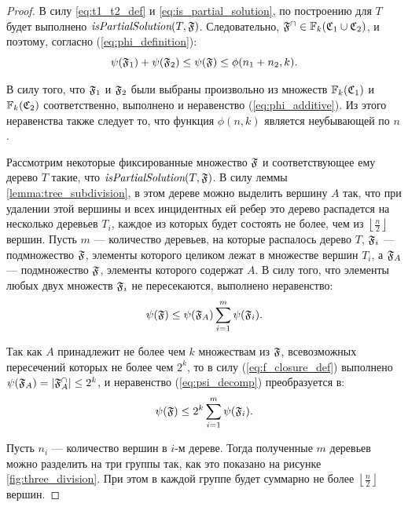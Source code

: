 \begin{proof}
В силу \ref{eq:t1_t2_def} и \ref{eq:is_partial_solution}, по построению для $T$ будет выполнено $\textit{isPartialSolution}(T, \mathfrak{F})$. Следовательно, $\mathfrak{F}^{\cap} \in \mathbb{F}_k(\mathfrak{C}_1 \cup \mathfrak{C}_2)$, и поэтому, согласно (\ref{eq:phi_definition}):
\begin{equation}
\psi(\mathfrak{F}_1) + \psi(\mathfrak{F}_2) \le \psi(\mathfrak{F}) \le \phi(n_1 + n_2, k) \text{.}
\end{equation}

В силу того, что $\mathfrak{F}_1$ и $\mathfrak{F}_2$ были выбраны произвольно из множеств $\mathbb{F}_k(\mathfrak{C}_1)$ и $\mathbb{F}_k(\mathfrak{C}_2)$ соответственно, выполнено и неравенство (\ref{eq:phi_additive}). Из этого неравенства также следует то, что функция $\phi(n, k)$ является неубывающей по $n$.

Рассмотрим некоторые фиксированные множество $\mathfrak{F}$ и соответствующее ему дерево $T$ такие, что $\textit{isPartialSolution}(T, \mathfrak{F})$. В силу леммы \ref{lemma:tree_subdivision}, в этом дереве можно выделить вершину $A$ так, что при удалении этой вершины и всех инцидентных ей ребер это дерево распадется на несколько деревьев $T_i$, каждое из которых будет состоять не более, чем из $\left\lfloor\frac{n}{2}\right\rfloor$ вершин. Пусть $m$ --- количество деревьев, на которые распалось дерево $T$, $\mathfrak{F}_i$ --- подмножество $\mathfrak{F}$, элементы которого целиком лежат в множестве вершин $T_i$, а $\mathfrak{F}_A$ --- подмножество $\mathfrak{F}$, элементы которого содержат $A$. В силу того, что элементы любых двух множеств $\mathfrak{F}_i$ не пересекаются, выполнено неравенство:
\begin{equation}\label{eq:psi_decomp}
\psi(\mathfrak{F}) \le \psi(\mathfrak{F}_A) \sum_{i = 1}^{m} \psi(\mathfrak{F}_i)\text{.}
\end{equation}

Так как $A$ принадлежит не более чем $k$ множествам из $\mathfrak{F}$, всевозможных пересечений которых не более чем $2^k$, то в силу (\ref{eq:f_closure_def}) выполнено $\psi(\mathfrak{F}_A) = |\mathfrak{F}^{\cap}_A| \le 2^k$, и неравенство (\ref{eq:psi_decomp}) преобразуется в:
\begin{equation}\label{eq:psi_decomp_2}
\psi(\mathfrak{F}) \le 2^k \sum_{i = 1}^{m} \psi(\mathfrak{F}_i)\text{.}
\end{equation}

Пусть $n_i$ --- количество вершин в $i$-м дереве. Тогда полученные $m$ деревьев можно разделить на три группы так, как это показано на рисунке \ref{fig:three_division}. При этом в каждой группе будет суммарно не более $\left\lfloor\frac{n}{2}\right\rfloor$ вершин.


\end{proof}

